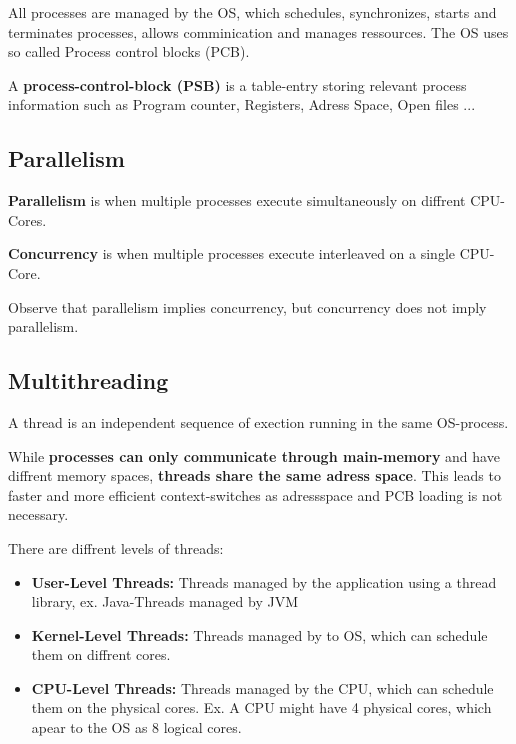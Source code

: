 All processes are managed by the OS, which schedules, synchronizes, starts and terminates processes, allows comminication and manages ressources. The OS uses so called Process control blocks (PCB).

\begin{definition}
    A \textbf{process-control-block (PSB)} is a table-entry storing relevant process information such as Program counter, Registers, Adress Space, Open files ...
\end{definition}

\subsection{Parallelism}

\begin{definition}
    \textbf{Parallelism } is when multiple processes execute simultaneously on diffrent CPU-Cores.
\end{definition}

\begin{definition}
    \textbf{Concurrency } is when multiple processes execute interleaved on a single CPU-Core.
\end{definition}

\begin{remark}
    Observe that parallelism implies concurrency, but concurrency does not imply parallelism.
\end{remark}

\subsection{Multithreading}

\begin{definition}
    A thread is an independent sequence of exection running in the same OS-process.
\end{definition}

\begin{remark}
    While \textbf{processes can only communicate through main-memory} and have diffrent memory spaces, \textbf{threads share
    the same adress space}. This leads to faster and more efficient context-switches as adressspace and PCB
    loading is not necessary.
\end{remark}

There are diffrent levels of threads:
\begin{itemize}
    \item \textbf{User-Level Threads: } Threads managed by the application using a thread library, ex. Java-Threads managed by JVM
    \item \textbf{Kernel-Level Threads: }Threads managed by to OS, which can schedule them on diffrent cores.
    \item \textbf{CPU-Level Threads:} Threads managed by the CPU, which can schedule them on the physical cores. Ex. A CPU might have 4 physical cores, which apear to the OS as 8 logical cores.
\end{itemize}

